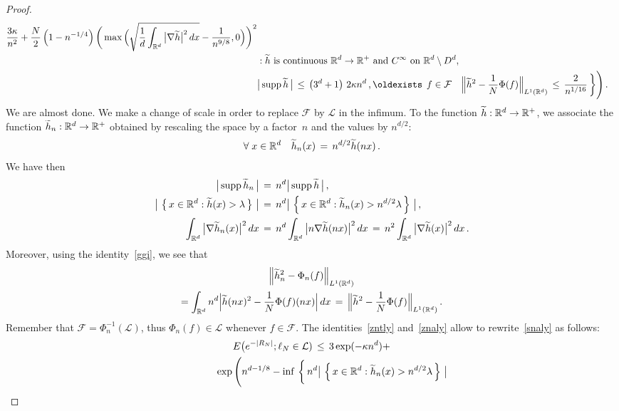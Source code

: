 \documentclass[10pt]{amsart}
\theoremstyle{definition}\newtheorem{defi}[theo]{Definition}\newtheorem{rema}[theo]{Remark}\newtheorem{exam}[theo]{Example}\newtheorem{exem}[theo]{Example}\newtheorem{nota}[theo]{Notation}
\newcommand*\supp{\text{supp\,}}
\newcommand*\Rd {{\mathbb R^d}}
\newcommand*\R{\mathbb{R}}
\newcommand*\hht{\smash{\widetilde h}}
\newcommand{\cF}{\mathcal{F}}
\newcommand{\cL}{\mathcal{L}}
\renewcommand*{\exists}{\mathrel{\oldexists}}
\let\oldforall\forall
\renewcommand*{\forall}{\mathrel{\oldforall}}
\begin{document}
\begin{proof}
\begin{multline}
\begin{aligned}
\frac{3\kappa}{n^2} +
\frac{N} {2} \left(1-n^{-1/4}\right)
\bigg(\max\Big(
\sqrt{
\frac{1}{d}\int_{\Rd}\big|\nabla \hht\big|^2\,dx }-
\frac{1}{n^{9/8}},0\Big) \bigg)^2
\\
& :\hht \text{ is continuous } \Rd\to\R^+
\text{ and }C^\infty\text{ on }\Rd\setminus D^d,\\
&\big|\,\supp\hht\,\big|\,\leq\, \left(3^d+1\right)\,2\kappa n^d\,,
\exists\,f\in\cF\quad
\Big\|\hht^2- \frac{1}{N} \Phi(f) \Big\|_{L^1(\Rd)}
\,\leq\,
\frac{2}{n^{1/16}}
\,\bigg\}\Bigg)\,.
\end{aligned}
\end{multline}
We are almost done. We make a change of scale in order to replace $\cF$ by $\cL$ in the infimum. To the function $\hht: \Rd\to\R^+$, we associate the function $\hht_n: \Rd\to\R^+$ obtained by rescaling the space by a factor~$n$ and the values by $n^{d/2}$:
\[
\forall x\in\Rd\quad \hht_n(x)\,=\,
{n^{d/2}} {\widetilde{h}(nx)}
\,.
\]
We have then
\begin{equation}\label{zntly}
\begin{aligned}
\big|\,\supp\hht_n\,\big|\,&=\, n^d\big|\,\supp\hht\,\big|\,,\\
\big|\,\left\{\,x\in \Rd:\hht(x)>\lambda\,\right\}\,\big| \,&=\, {n^d}
\big|\,\left\{\,x\in \Rd:\hht_n(x)>n^{d/2}{\lambda}\,\right\}\,\big|
\,,\\
\int_{\Rd}\big|\nabla \hht_n(x)\big|^2\,dx \,&=\, n^d
\int_{\Rd}\big| n
\nabla {\widetilde{h}}(nx)\big|^2\,dx
\,=\, n^{2}
\int_{\Rd}\big|
\nabla {\widetilde{h}}(x)\big|^2\,dx
\,.
\end{aligned}
\end{equation}
Moreover, using the identity~\eqref{ggi}, we see that
\begin{multline}\label{znaly}
\Big\|\hht_n^2- \Phi_n(f) \Big\|_{L^1(\Rd)}\\
=\int_{\Rd} n^d\Big|\hht(nx)^2-
\frac{1}{N} \Phi(f)(nx)
\Big|\,dx\,=\,
\Big\|\hht^2- \frac{1}{N} \Phi(f) \Big\|_{L^1(\Rd)}\,.
\end{multline}
Remember that $\cF=\Phi_n^{-1}(\cL)$, thus $\Phi_n(f)\in\cL$ whenever $f\in\cF$. The identities~\eqref{zntly} and~\eqref{znaly} allow to rewrite~\eqref{snaly} as follows:
\begin{multline}\label{tnaly}
E\big(e^{-|R_N|};
\ell_N\in\cL)\,\leq\, 3\exp(-\kappa n^d)+
\\
\begin{aligned}
&\mkern90mu\exp\Bigg(n^{d-1/8}-
\inf\,\bigg\{\, n^d
\big|\,\left\{\,x\in \Rd:\hht_n(x)>n^{d/2}{\lambda}\,\right\}\,\big|

\end{aligned}
\end{multline}
\end{proof}
\end{document}
